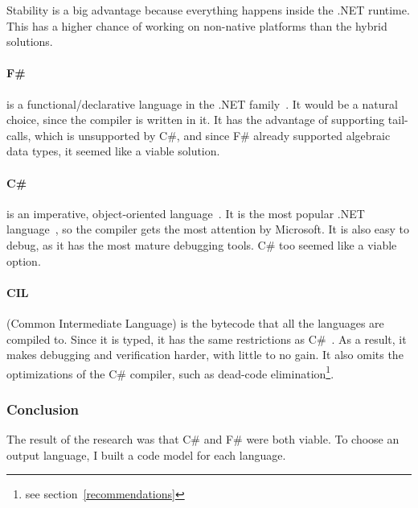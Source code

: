 Stability is a big advantage because everything happens inside the .NET runtime.
This has a higher chance of working on non-native platforms than the hybrid solutions.

\paragraph{F\#} is a functional/declarative language in the .NET family~\cite{smith}.
It would be a natural choice, since the compiler is written in it.
It has the advantage of supporting tail-calls, which is unsupported by C\#,
  and since F\# already supported algebraic data types, it seemed like a viable solution.


\paragraph{C\#}
is an imperative, object-oriented language~\cite{ecma334}.
It is the most popular .NET language~\cite{Meyerovich}, so the compiler gets the most attention by Microsoft.
It is also easy to debug, as it has the most mature debugging tools.
C\# too seemed like a viable option.


\paragraph{CIL}
(Common Intermediate Language) is the bytecode that all the languages are compiled to.
Since it is typed, it has the same restrictions as C\#~\cite{ecma335}.
As a result, it makes debugging and verification harder, with little to no gain.
It also omits the optimizations of the C\# compiler, such as dead-code elimination\footnote{see section~\ref{recommendations}}.

\subsubsection{Conclusion}
The result of the research was that C\# and F\# were both viable.
To choose an output language, I built a code model for each language.

